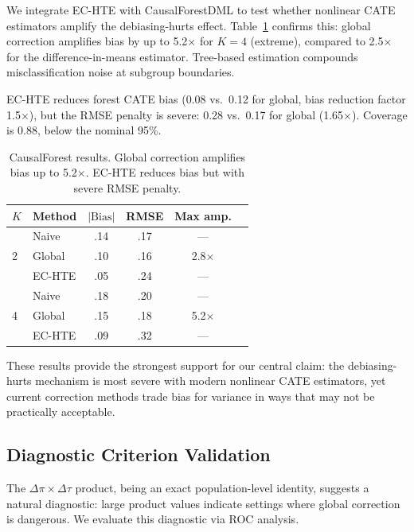 \documentclass[11pt]{article}
\begin{document}
We integrate EC-HTE with CausalForestDML \citep{athey2019generalized} to test whether nonlinear CATE estimators amplify the debiasing-hurts effect.
Table~\ref{tab:causal-forest} confirms this: global correction amplifies bias by up to 5.2$\times$ for $K{=}4$ (extreme), compared to 2.5$\times$ for the difference-in-means estimator.
Tree-based estimation compounds misclassification noise at subgroup boundaries.

EC-HTE reduces forest CATE bias (0.08 vs.\ 0.12 for global, bias reduction factor 1.5$\times$), but the RMSE penalty is severe: 0.28 vs.\ 0.17 for global (1.65$\times$).
Coverage is 0.88, below the nominal 95\%.

\begin{table}[t]
\centering
\small
\caption{CausalForest results. Global correction amplifies bias up to 5.2$\times$. EC-HTE reduces bias but with severe RMSE penalty.}
\label{tab:causal-forest}
\begin{tabular}{@{}llcccc@{}}
\toprule
$K$ & Method & $|\text{Bias}|$ & RMSE & Max amp. \\
\midrule
\multirow{3}{*}{2} & Naive & .14 & .17 & --- \\
& Global & .10 & .16 & 2.8$\times$ \\
& EC-HTE & .05 & .24 & --- \\
\midrule
\multirow{3}{*}{4} & Naive & .18 & .20 & --- \\
& Global & .15 & .18 & 5.2$\times$ \\
& EC-HTE & .09 & .32 & --- \\
\bottomrule
\end{tabular}
\end{table}

These results provide the strongest support for our central claim: the debiasing-hurts mechanism is most severe with modern nonlinear CATE estimators, yet current correction methods trade bias for variance in ways that may not be practically acceptable.

\subsection{Diagnostic Criterion Validation}
\label{sec:exp-diagnostic}

The $\Delta\pi \times \Delta\tau$ product, being an exact population-level identity, suggests a natural diagnostic: large product values indicate settings where global correction is dangerous.
We evaluate this diagnostic via ROC analysis.
\end{document}
